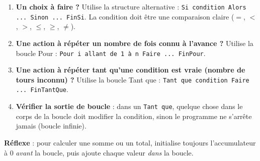 \documentclass[11pt]{article}
\newcommand{\cle}[1]{{\popxbold\color{popdark}#1}}
\begin{document}
\begin{methode}
\begin{enumerate}
\item \textbf{Un choix à faire ?} Utilise la structure \cle{alternative} : \texttt{Si condition Alors ... Sinon ... FinSi}. La condition doit être une comparaison claire ($=$, $<$, $>$, $\leq$, $\geq$, $\neq$).
\item \textbf{Une action à répéter un nombre de fois connu à l'avance ?} Utilise la boucle \cle{Pour} : \texttt{Pour i allant de 1 à n Faire ... FinPour}.
\item \textbf{Une action à répéter tant qu'une condition est vraie (nombre de tours inconnu) ?} Utilise la boucle \cle{Tant que} : \texttt{Tant que condition Faire ... FinTantQue}.
\item \textbf{Vérifier la sortie de boucle} : dans un \texttt{Tant que}, quelque chose dans le corps de la boucle doit modifier la condition, sinon le programme ne s'arrête jamais (boucle infinie).
\end{enumerate}
\textbf{Réflexe} : pour calculer une somme ou un total, initialise toujours l'accumulateur à 0 \emph{avant} la boucle, puis ajoute chaque valeur \emph{dans} la boucle.
\end{methode}
\end{document}
